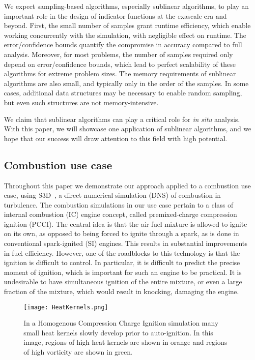 \documentclass[final]{siamltex}
\begin{document}
We expect sampling-based algorithms, especially sublinear algorithms, to play an 
important role in the design of indicator functions at the  exascale era and beyond.  First, 
the small number of samples grant runtime efficiency, which enable working 
concurrently with the simulation, with  negligible effect on runtime.  
The error/confidence bounds quantify the  compromise in accuracy compared to full analysis. Moreover, for most 
problems, the number of samples required only depend on  error/confidence bounds, 
which lead to perfect scalability of these algorithms for extreme problem sizes. The memory 
requirements of  sublinear algorithms are also  small, and typically  only in the 
order of the samples.  In some cases,  additional data structures may be necessary 
to enable random sampling,  but even  such structures are not memory-intensive. 

We claim that  sublinear algorithms can play a critical role  for \emph{in
situ} analysis. With this 
paper, we  will showcase one application of sublinear algorithms, and we hope that   our 
success will draw attention to this field with high potential. 

\subsection{Combustion use case}
Throughout this paper we demonstrate our approach applied to a combustion
use case, using S3D~\cite{chen09}, a direct numerical simulation (DNS) of 
combustion in turbulence.  
The combustion simulations in our use case pertain to a class of internal combustion
(IC) engine concept, called premixed-charge compression ignition (PCCI). The
central idea is that the air-fuel mixture is allowed to ignite on its own, as opposed to being forced to ignite through a spark, as
is done in conventional spark-ignited (SI) engines. This results in
substantial improvements in fuel efficiency. However, one of the roadblocks to
this technology is that the ignition is difficult to control. In
particular, it is difficult to predict the precise moment of ignition,
which is important for such an engine to be practical. It is undesirable to
have simultaneous ignition of the entire mixture, or even a large fraction
of the mixture, which would result in knocking, damaging the engine. \\ 

\begin{figure}[th]
\centering
\texttt{[image: HeatKernels.png]}
\caption{\label{fig:kernels} In a Homogenous Compression Charge Ignition
simulation many small heat kernels slowly develop prior to auto-ignition.
In this image, regions of high heat kernels are shown in orange and regions
of high vorticity are shown in green.}
\end{figure}
\end{document}
